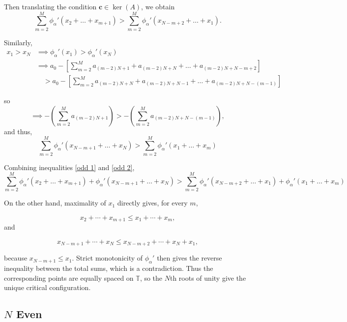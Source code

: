 \documentclass{article}
\begin{document}
Then translating the condition $\mathbf{c}\in\ker(A)$, we obtain
\begin{equation}\label{odd 1}
    \sum_{m=2}^{M} \phi_\alpha '(x_{2}+\dots+x_{m+1}) > \sum_{m=2}^{M} \phi_\alpha '(x_{N-m+2}+\dots+x_{1}).
\end{equation}

Similarly, 
\begin{align*}
x_{1} > x_{N} &\implies \phi_\alpha '(x_{1}) > \phi_\alpha '(x_{N}) \\
&\implies a_{0} - \left[\sum_{m=2}^{M} a_{(m-2)N+1} + a_{(m-2)N+N} + \dots + a_{(m-2)N+N-m+2}\right] \\
&\quad > a_{0} - \left[\sum_{m=2}^{M} a_{(m-2)N+N} + a_{(m-2)N+N-1} + \dots + a_{(m-2)N+N-(m-1)}\right] 
\end{align*}

so 
\[\implies -\left(\sum_{m=2}^{M} a_{(m-2)N+1}\right) > -\left(\sum_{m=2}^{M} a_{(m-2)N+N-(m-1)}\right),\]
and thus, 
\begin{equation}\label{odd 2}
   \sum_{m=2}^{M} \phi_\alpha '(x_{N-m+1}+\dots+x_{N}) > \sum_{m=2}^{M} \phi_\alpha '(x_{1}+\dots+x_{m})
\end{equation}


\noindent Combining inequalities \ref{odd 1} and \ref{odd 2},
\[
\sum_{m=2}^{M} \phi_\alpha '(x_{2}+\dots+x_{m+1}) + \phi_\alpha '(x_{N-m+1}+\dots+x_{N}) > \sum_{m=2}^{M} \phi_\alpha '(x_{N-m+2}+\dots+x_{1}) + \phi_\alpha '(x_{1}+\dots+x_{m})
\]

On the other hand, maximality of $x_1$ directly gives, for every $m$,

$$ x_2+\cdots+x_{m+1} \leq x_1+\cdots+x_m, $$
 and

$$ x_{N-m+1}+\cdots+x_N \leq x_{N-m+2}+\cdots+x_N+x_1, $$

because \(x_{N-m+1}\leq x_1\). Strict monotonicity of \(\phi_\alpha'\) then gives the reverse inequality between the total sums, which is a contradiction. Thus the corresponding points are equally spaced on $\mathbb{T}$, so the $N$th roots of unity give the unique critical configuration.




\subsection{$N$ Even}
\end{document}
